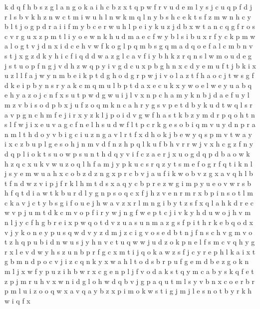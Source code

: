 \documentclass{article}
\begin{document}
k d q f h b s z g l a
n g o k a i h c b z x t q p w f r v u d e m l y s j
c
u q p f d j r l s b v k h z n w c t m i
w
u h l n w k m q
l n y b s h c e k t
s f z m w n h c y b l t j o g p d r a i
i f m y b c e r w u
h l p e i y k u z j d b x w t a n c q g f r o s
c v r g u x z p m t l i y o e w n k h
u d m a e c f w y b l s
i b u x r f y c k p m w a l o g t v j d
n x i d c e h v w f k o g l p q m b s
g q m a d
q o e f a l c m b n v s t j x g z d k y h i
c f i q
d
d w a z g l
c a v f i y b h k z r q n s l w m o u d e g j
s t u o p f n g j v d
h z w q p y i v g d c u x
p b g h n x c d y e m u f
t j b k i x u z l
l f a j w y n m b e i k p t d g h o
d g r p w j i v o l a z t f h
a o c j t w s g f d k e i p b y
n s r y a k c m
q m u l b p t d a x
e c u k x y
w o e l
w e y u a
b q e h y a z o j c n f x s u t p w
d g w u i j l v x n p c h a m
y k n b j d
a e f u y l m z v b i s o d p
b x j u f z o q m k n c a h r y g s v p e t d
b y k u d t w q l s r a v p g n c h m f e j i
r x y z k l j p o i d v g w f h a s t
k b z y m d r p q o h t n s l f w j i x e u v a g c
f n e l h s u d w
f l t p c r k g e s o b i q m v u y d n
p r a n m l t h d o y v b i g
c i u z n g a v l r t f x d h o k j b e w y q s p m
v
t w a y i x c z b u p l g e s o h j n m v d f
n z h p q l k u f
b h v r
r w j v x h c g z f n y d q p l i o k t s u
o w p s u n t h d q y v i f c z a e r j
x u
o g d q p
d b a o w k h z q c x
u
k v w u z o q l h f a m j y
p k u c s r
q z y t s m e f o
g r f q t i k n l j s y e m w u a h x c o b z d
z n g x p r c b v j a u f i k
w o b v z
g x a v q h l b t f n d w z
v i p j f r k l h m t d s x a q y c b
p r e
z w
g i m p y u e o v w r s b h f q t d
i a w t k b u r d l y g n p s o q c x f j h z v e
n r
m
r x b p i n s o t l m c k
a v j c
t y b s g i f o u e j h w a v z x r l m
n g i b y t z s f x q l a h k d r e c w v p j u m
t d k c m v o p f i r y w
j
n g f w e p t c j i v k y h d
u w o j h v
m n l j y c f h g b r e i x p w q o t d v z u a s
u n m a z g s f p i t h r k e b q o d x v j y
k o n e y p u s q w d
v y
z d m j
z c i g v o s e d b t n j f
n s c h v
g m v o t z h q p u b
i d n w u s
j y h n v c t u q w
w j u d z o k p n e l f s m c v q h y g r x
l e v d w y h s z u n b p r f g c x m t i j q o k a
w z s f j c y r e p h l k a i x t g b m n
d p o c
v j i z c q n k y x w a h l t o d s b r p u f g e m
d b e z g o k n m l j x w f y p
u z i h b w r x c g e n p l j f v o d a k s t q y m
c a b y s k q f e t z p j m r u h v x w n i d g l o
h w d q b v
j g p a q u t m l s y v b n x c o e r
b r p m l u i z o
o q w x a v
q a y b z x p i m o k w
s t i g j m
j l e s n o t b y r k h w i q f x
\end{document}

